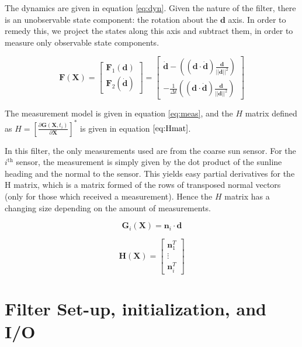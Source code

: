 \documentclass[]{BasiliskReportMemo}
\begin{document}
The dynamics are given in equation \ref{eq:dyn}. Given the nature of the filter, there is an unobservable state component: the rotation about the $\bm d$ axis. In order to remedy this, we project the states along this axis and subtract them, in order to measure only observable state components. 

\begin{equation}\label{eq:dyn}
\bm F(\bm X) = \begin{bmatrix} \bm F_1(\bm d) \\  \bm F_2(\dot{\bm d})\end{bmatrix} =  \begin{bmatrix} \dot{\bm d} - \left( (\bm d \cdot \dot{\bm d} )\frac{\bm d}{||\bm d||^2} \right) \\ - \frac{1}{\Delta t}\left( (\bm d \cdot \dot{\bm d}) \frac{\bm d}{||\bm d||^2} \right)\end{bmatrix} 
\end{equation}

The measurement model is given in equation \ref{eq:meas}, and the $H$ matrix defined as $H = \left[\frac{\partial \bm G (\bm X, t_i)}{\partial \bm X}\right]^{*}$ is given in equation $\ref{eq:Hmat}$. 

In this filter, the only measurements used are from the coarse sun sensor. For the $i^\mathrm{th}$ sensor, the measurement is simply given by the dot product of the sunline heading and the normal to the sensor. This yields easy partial derivatives for the H matrix, which is a matrix formed of the rows of transposed normal vectors (only for those which received a measurement). Hence the $H$ matrix has a changing size depending on the amount of measurements. 

\begin{equation}\label{eq:meas}
\bm G_i(\bm X) = \bm n_i \cdot \bm d
\end{equation}

\begin{equation}\label{eq:Hmat}
\bm H(\bm X) = \begin{bmatrix} \bm n_1^T \\ \vdots \\ \bm n_i^T \end{bmatrix} 
\end{equation}

\section{Filter Set-up, initialization, and I/O}
\end{document}
